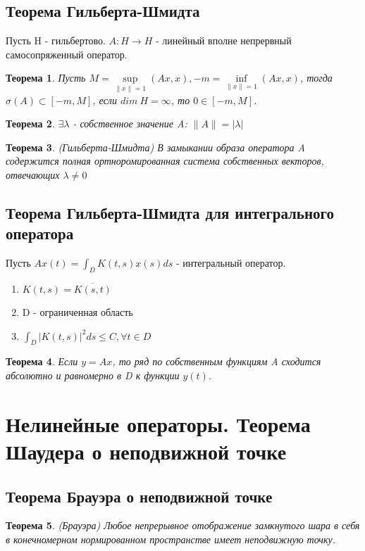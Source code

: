 \documentclass[9pt, a4paper]{extarticle}
\newtheorem{theorem}{Теорема}
\numberwithin{equation}{section}
\numberwithin{lemma}{section}
\numberwithin{definition}{section}
\numberwithin{notabene}{section}
\numberwithin{corollary}{section}
\begin{document}
\subsection{Теорема Гильберта-Шмидта}
	Пусть H - гильбертово. $A: H \to H$ - линейный вполне непрервный самосопряженный оператор.
	\begin{theorem}
		Пусть $M = \sup\limits_{\|x\| = 1} (Ax, x), -m = \inf\limits_{\|x\| = 1} (Ax, x)$, тогда $\sigma(A) \subset [-m, M]$, если $dim\ H = \infty$, то $0 \in [-m, M]$. 
	\end{theorem}
	\begin{theorem}
		$\exists \lambda$ - собственное значение A: $\|A\| = |\lambda|$
	\end{theorem}
	\begin{theorem}
		(Гильберта-Шмидта)\newline
		В замыкании образа оператора A содержится полная ортноромированная система собственных векторов, отвечающих $\lambda \neq 0$
	\end{theorem}
\subsection{Теорема Гильберта-Шмидта для интегрального оператора}
	Пусть $Ax(t) = \int_D K(t,s) x(s) ds$ - интегральный оператор.
	\begin{enumerate}
		\item $K(t,s) = \overline{K(s,t)}$
		\item D - ограниченная область
		\item $\int_D |K(t,s)|^2 ds \leq C , \forall t \in D$
	\end{enumerate}
	\begin{theorem}
		Если $y = Ax$, то ряд по собственным функциям A сходится абсолютно и равномерно в D к функции $y(t)$. 
	\end{theorem}
\section{Нелинейные операторы. Теорема Шаудера о неподвижной точке}
\subsection{Теорема Брауэра о неподвижной точке}
 \begin{theorem}
 	(Брауэра)\newline
 	Любое непрерывное отображение замкнутого шара в себя в конечномерном нормированном пространстве имеет неподвижную точку. 
 \end{theorem}
\end{document}

